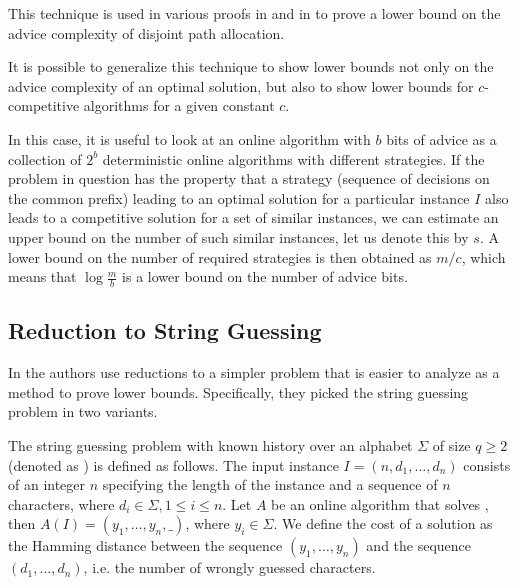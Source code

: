 This technique is used in various proofs in \cite{misof-trivial-graphs}
and in \cite{komm-thesis} to prove a lower bound on the advice complexity
of disjoint path allocation.

It is possible to generalize this technique to show lower bounds not only
on the advice complexity of an optimal solution, but also to show lower
bounds for $c$-competitive algorithms for a given constant $c$.

In this case, it is useful to look at an online algorithm with $b$ bits of
advice as a collection of $2^b$ deterministic online algorithms with
different strategies. If the problem in question has the property that a
strategy (sequence of decisions on the common prefix) leading to an
optimal solution for a particular instance $I$ also leads to a competitive
solution for a set of similar instances, we can estimate an upper bound on
the number of such similar instances, let us denote this by $s$. A lower
bound on the number of required strategies is then obtained as $m/c$,
which means that $\log\frac{m}{b}$ is a lower bound on the number of
advice bits.

\subsection{Reduction to String Guessing}
\label{section:string-guessing}

In \cite{string-guessing} the authors use reductions to a simpler problem
that is easier to analyze as a method to prove lower bounds. Specifically,
they picked the string guessing problem in two variants.

\begin{definition}
    The string guessing problem with known history over an alphabet
    $\Sigma$ of size $q \geq 2$ (denoted as ) is defined as
    follows. The input instance $I = (n, d_1, \dots, d_n)$ consists of an
    integer $n$ specifying the length of the instance and a sequence of
    $n$ characters, where $d_i \in \Sigma, 1 \leq i \leq n$. Let $A$ be an
    online algorithm that solves , then $A(I) = (y_1, \dots, y_n,
    \_)$, where $y_i \in \Sigma$. We define the cost of a solution as the
    Hamming distance between the sequence $(y_1, \dots, y_n)$ and the
    sequence $(d_1, \dots, d_n)$, i.e. the number of wrongly guessed
    characters.
\end{definition}

